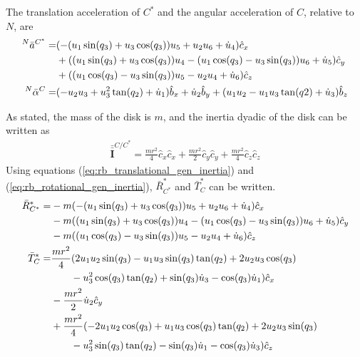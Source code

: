 \documentclass[smallcondensed,final]{svjour3}                     %
\begin{document}
The translation acceleration of $C^*$ and the angular acceleration of $C$,
relative to $N$, are
\begin{align}
    {^N}\bar{a}^{C^*} =& (-(u_1 \sin(q_3) + u_3 \cos(q_3)) u_5 + u_2 u_6 +
                         \dot{u}_4) \hat{c}_x \notag \\
                      & + ((u_1 \sin(q_3) + u_3 \cos(q_3)) u_4 - (u_1
                         \cos(q_3) - u_3 \sin(q_3)) u_6 + \dot{u}_5) \hat{c}_y
                         \notag\\
                      & + ((u_1 \cos(q_3) - u_3 \sin(q_3)) u_5 - u_2 u_4 +
                         \dot{u}_6) \hat{c}_z \\
    {^N}\bar{\alpha}^{C} =& (-u_2 u_3 + u_3^2 \tan(q_2) + \dot{u}_1) \hat{b}_x
                         + \dot{u}_2 \hat{b}_y + (u_1 u_2 - u_1 u_3 \tan(q2) +
                         \dot{u}_3) \hat{b}_z
\end{align}

As stated, the mass of the disk is $m$, and the inertia dyadic of the disk can
be written as
\begin{align}
    \bar{\bar{\mathbf{I}}}^{C/C^*} = \frac{m r^2}{4} \hat{c}_x\hat{c}_x +
    \frac{m r^2}{2} \hat{c}_y\hat{c}_y + \frac{m r^2}{4} \hat{c}_z\hat{c}_z
\end{align}
Using equations (\ref{eq:rb_translational_gen_inertia}) and
(\ref{eq:rb_rotational_gen_inertia}), $\bar{R}^*_{C^*}$ and $\bar{T}^*_C$ can be
written.
\begin{align}
    \bar{R}^*_{C^*} =& - m (- (u_{1} \sin(q_{3}) + u_{3}
                       \cos(q_{3})) u_{5} + u_{2} u_{6} +
                       \dot{u}_{4}) \hat{c}_x \notag \\
                     & - m ((u_{1} \sin(q_{3}) + u_{3}
                       \cos(q_{3})) u_{4} - (u_{1}
                       \cos(q_{3}) - u_{3}
                       \sin(q_{3})) u_{6} + \dot{u}_{5})
                       \hat{c}_y \notag \\
                     & - m ((u_{1} \cos(q_{3}) - u_{3}
                       \sin(q_{3})) u_{5} - u_{2} u_{4} +
                   \dot{u}_{6}) \hat{c}_z \\
    \bar{T}^*_C =& \frac{m r^{2}}{4} (2 u_{1} u_{2} \sin(q_{3})
                   - u_{1} u_{3} \sin(q_{3}) \tan(q_{2})
                   + 2 u_{2} u_{3} \cos(q_{3}) \notag\\&\quad\quad- u_{3}^2
                   \cos(q_{3}) \tan(q_{2}) +
                   \sin(q_{3}) \dot{u}_{3} - \cos(q_{3})
                   \dot{u}_{1}) \hat{c}_x \notag \\
                 & - \frac{m r^{2}}{2} \dot{u}_{2} \hat{c}_y \notag \\
                 & + \frac{m r^{2}}{4} (- 2 u_{1} u_{2}
                   \cos(q_{3}) + u_{1} u_{3} \cos(q_{3})
                   \tan(q_{2}) + 2 u_{2} u_{3}
                   \sin(q_{3}) \notag\\&\quad\quad - u_{3}^2 \sin(q_{3})
                   \tan(q_{2}) - \sin(q_{3}) \dot{u}_{1}
                   - \cos(q_{3}) \dot{u}_{3}) \hat{c}_z
\end{align}
\end{document}
